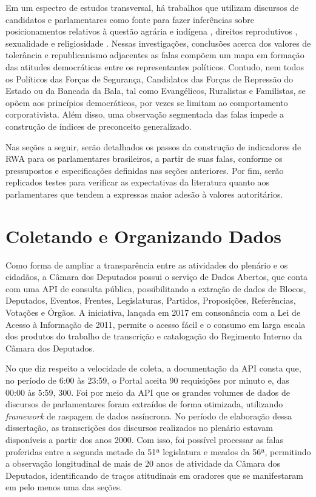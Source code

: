 \documentclass[
12pt,				%
openright,			%
twoside,			%
a4paper,			%
english,			%
french,				%
spanish,			%
brazil				%
]{abntex2}
\begin{document}
Em um espectro de estudos transversal, há trabalhos que utilizam discursos de candidatos e parlamentares como fonte para fazer inferências sobre posicionamentos relativos à questão agrária e indígena \cite{xavier2015senhores}, direitos reprodutivos \cite{miguel2017direito, santos2017debate}, sexualidade \cite{machado2013discursos, lacerda2016ideologia} e religiosidade \cite{gonccalves2016discurso}. Nessas investigações, conclusões acerca dos valores de tolerância e republicanismo adjacentes as falas compõem um mapa em formação das atitudes democráticas entre os representantes políticos. Contudo, nem todos os Políticos das Forças de Segurança, Candidatos das Forças de Repressão do Estado ou da Bancada da Bala, tal como Evangélicos, Ruralistas e Familistas, se opõem aos princípios democráticos, por vezes se limitam ao comportamento corporativista. Além disso, uma observação segmentada das falas impede a construção de índices de preconceito generalizado. 

Nas seções a seguir, serão detalhados os passos da construção de indicadores de RWA para os parlamentares brasileiros, a partir de suas falas, conforme os pressupostos e especificações definidas nas seções anteriores. Por fim, serão replicados testes para verificar as expectativas da literatura quanto aos parlamentares que tendem a expressas maior adesão à valores autoritários.

\section{Coletando e Organizando Dados}

Como forma de ampliar a transparência entre as atividades do plenário e os cidadãos, a Câmara dos Deputados possui o serviço de Dados Abertos, que conta com uma API de consulta pública, possibilitando a extração de dados de Blocos, Deputados, Eventos, Frentes, Legislaturas, Partidos, Proposições, Referências, Votações e Órgãos. A iniciativa, lançada em 2017 em consonância com a Lei de Acesso à Informação de 2011, permite o acesso fácil e o consumo em larga escala dos produtos do trabalho de transcrição e catalogação do Regimento Interno da Câmara dos Deputados.

No que diz respeito a velocidade de coleta, a documentação da API consta que, no período de 6:00 às 23:59, o Portal aceita 90 requisições por minuto e, das 00:00 às 5:59, 300. Foi por meio da API que os grandes volumes de dados de discursos de parlamentares foram extraídos de forma otimizada, utilizando \emph{framework} de raspagem de dados assíncrona. No período de elaboração dessa dissertação, as transcrições dos discursos realizados no plenário estavam disponíveis a partir dos anos 2000. Com isso, foi possível processar as falas proferidas entre a segunda metade da 51ª legislatura e meados da 56ª, permitindo a observação longitudinal de mais de 20 anos de atividade da Câmara dos Deputados, identificando de traços atitudinais em oradores que se manifestaram em pelo menos uma das seções.
\end{document}
